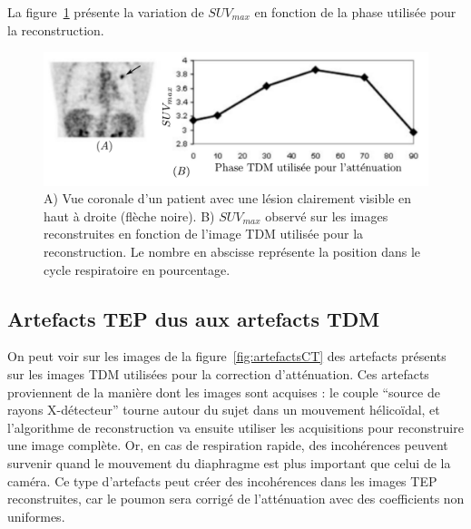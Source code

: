La figure~\ref{fig:lesionEnFctPhaseTDM} présente la variation de $SUV_{max}$ en fonction de la phase utilisée pour la reconstruction.


\begin{figure}[h!]
	\vspace{0.5cm}
	\centering
			\includegraphics[width=12cm]{images/lesionEnFctPhaseTDM}
	\vspace{-0.5cm}
	\caption[Influence de l'influence de la carte d'atténuation sur l'activité des lésions] {A) Vue coronale d'un patient avec une lésion clairement visible en haut à droite (flèche noire).  B) $SUV_{max}$ observé sur les images reconstruites en fonction de l'image TDM utilisée pour la reconstruction. Le nombre en abscisse représente la position dans le cycle respiratoire en pourcentage.} 
	\label{fig:lesionEnFctPhaseTDM}
\end{figure}

\subsection{Artefacts TEP dus aux artefacts TDM}

On peut voir sur les images de la figure~\ref{fig:artefactsCT} des artefacts présents sur les images TDM utilisées pour la correction d'atténuation. Ces artefacts proviennent de la manière dont les images sont acquises : le couple ``source de rayons X-détecteur'' tourne autour du sujet dans un mouvement hélicoïdal, et l'algorithme de reconstruction va ensuite utiliser les acquisitions pour reconstruire une image complète. Or, en cas de respiration rapide, des incohérences peuvent survenir quand le mouvement du diaphragme est plus important que celui de la caméra. Ce type d'artefacts peut créer des incohérences dans les images TEP reconstruites, car le poumon sera corrigé de l'atténuation avec des coefficients non uniformes.

